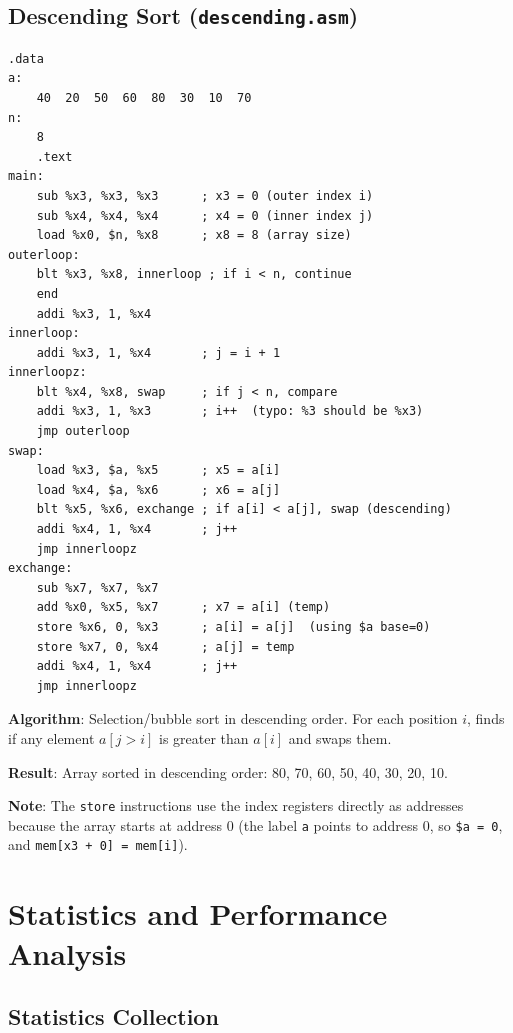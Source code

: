 \documentclass[12pt,a4paper]{article}
\begin{document}
\subsection{Descending Sort (\texttt{descending.asm})}

\begin{lstlisting}[style=asmstyle, caption={descending.asm -- Bubble Sort}]
.data
a:
    40  20  50  60  80  30  10  70
n:
    8
    .text
main:
    sub %x3, %x3, %x3      ; x3 = 0 (outer index i)
    sub %x4, %x4, %x4      ; x4 = 0 (inner index j)
    load %x0, $n, %x8      ; x8 = 8 (array size)
outerloop:
    blt %x3, %x8, innerloop ; if i < n, continue
    end
    addi %x3, 1, %x4
innerloop:
    addi %x3, 1, %x4       ; j = i + 1
innerloopz:
    blt %x4, %x8, swap     ; if j < n, compare
    addi %x3, 1, %x3       ; i++  (typo: %3 should be %x3)
    jmp outerloop
swap:
    load %x3, $a, %x5      ; x5 = a[i]
    load %x4, $a, %x6      ; x6 = a[j]
    blt %x5, %x6, exchange ; if a[i] < a[j], swap (descending)
    addi %x4, 1, %x4       ; j++
    jmp innerloopz
exchange:
    sub %x7, %x7, %x7
    add %x0, %x5, %x7      ; x7 = a[i] (temp)
    store %x6, 0, %x3      ; a[i] = a[j]  (using $a base=0)
    store %x7, 0, %x4      ; a[j] = temp
    addi %x4, 1, %x4       ; j++
    jmp innerloopz
\end{lstlisting}

\textbf{Algorithm}: Selection/bubble sort in descending order. For each position $i$, finds if any element $a[j > i]$ is greater than $a[i]$ and swaps them.

\textbf{Result}: Array sorted in descending order: 80, 70, 60, 50, 40, 30, 20, 10.

\textbf{Note}: The \texttt{store} instructions use the index registers directly as addresses because the array starts at address 0 (the label \texttt{a} points to address 0, so \texttt{\$a = 0}, and \texttt{mem[x3 + 0] = mem[i]}).

\section{Statistics and Performance Analysis}

\subsection{Statistics Collection}
\end{document}
